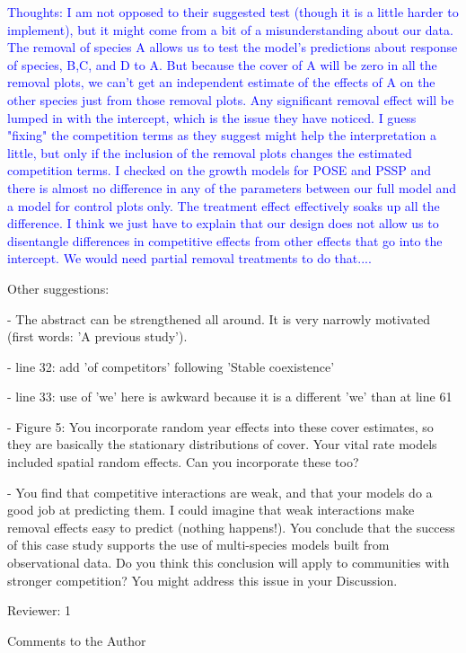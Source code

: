 \documentclass[12pt]{article}
\newcommand{\response}{\textcolor{blue}}
\begin{document}
{\response{ Thoughts: I am not opposed to their suggested test (though it is a little harder to implement), but it might come from a bit of a misunderstanding 
about our data. The removal of species A allows us to test the model's predictions about response of species, B,C, and D to A. But because the cover of A
will be zero in all the removal plots, we can't get an independent estimate of the effects of A on the other species just from those removal plots. Any significant removal effect will be lumped in with the intercept, which is the issue they have noticed. I guess "fixing" the competition terms as they
suggest might help the interpretation a little, but only if the inclusion of the removal plots changes the estimated competition terms. I checked on the growth models for POSE and PSSP and there is almost no difference in any of the parameters between our full model and a model for control plots only. The treatment effect effectively soaks up all the difference. I think we just have to explain that our design does not allow us to disentangle differences in competitive effects from other effects that go into the intercept. We would need partial removal treatments to do that....}


Other suggestions:

- The abstract can be strengthened all around. It is very narrowly motivated (first words: 'A previous study').

- line 32: add 'of competitors' following 'Stable coexistence'

- line 33: use of 'we' here is awkward because it is a different 'we' than at line 61

- Figure 5: You incorporate random year effects into these cover estimates, so they are basically the stationary distributions of cover. Your vital rate models included spatial random effects. Can you incorporate these too?

- You find that competitive interactions are weak, and that your models do a good job at predicting them. I could imagine that weak interactions make removal effects easy to predict (nothing happens!). You conclude that the success of this case study supports the use of multi-species models built from observational data. Do you think this conclusion will apply to communities with stronger competition? You might address this issue in your Discussion.

Reviewer: 1

Comments to the Author

}
\end{document}
